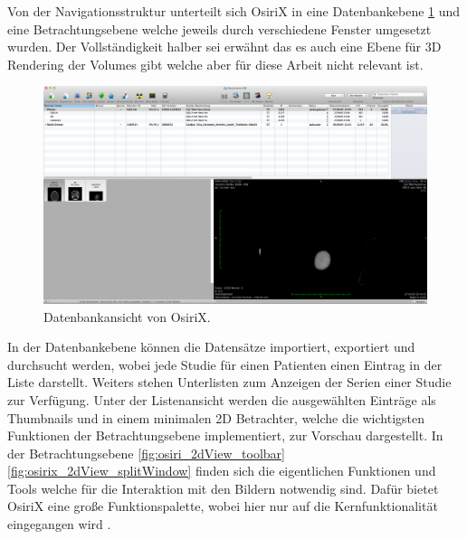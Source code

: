 Von der Navigationsstruktur unterteilt sich OsiriX in eine Datenbankebene \ref{fig:osirix_db_view} und eine Betrachtungsebene welche jeweils durch verschiedene Fenster umgesetzt wurden.
Der Vollständigkeit halber sei erwähnt das es auch eine Ebene für 3D Rendering der Volumes gibt welche aber für diese Arbeit nicht relevant ist.
\begin{figure}[t]
	\centering
	\includegraphics[width=0.8\linewidth]{img/c2_osirix_db_view.jpg}
	\caption{Datenbankansicht von OsiriX.}
	\label{fig:osirix_db_view}
\end{figure}
In der Datenbankebene können die Datensätze importiert, exportiert und durchsucht werden, wobei jede Studie für einen Patienten einen Eintrag in der Liste darstellt.
Weiters stehen Unterlisten zum Anzeigen der Serien einer Studie zur Verfügung.
Unter der Listenansicht werden die ausgewählten Einträge als Thumbnails und in einem minimalen 2D Betrachter,
welche die wichtigsten Funktionen der Betrachtungsebene implementiert, zur Vorschau dargestellt.
In der Betrachtungsebene \ref{fig:osiri_2dView_toolbar} \ref{fig:osirix_2dView_splitWindow} finden sich die eigentlichen Funktionen und Tools welche für die Interaktion mit den Bildern notwendig sind.
Dafür bietet OsiriX eine große Funktionspalette, wobei hier nur auf die Kernfunktionalität eingegangen wird \cite{osirix}.
